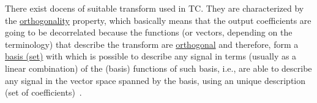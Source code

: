 \begin{comment}

  The Figure~\ref{fig:transform_coding} shows the stages that are
  tipycally involved in a transform-based signal compression system.

\begin{figure}
  \begin{center}
\begin{verbatim}
   s   +---+   w    +---+   k    +---+    c
 ----->| T |------->| Q |------->| E |-----------+
  (s)  +---+  (s)   +---+  (~s)  +---+   (~s)    |
samples   coefficients   indexes      code-words ~
                                                 :
                                                 ~
   ~s  +---+    w   +---+   k    +---+           |
 <-----| t |<-------| q |<-------| D |<----------+
  (~s) +---+  (~s)  +---+  (~s)  +---+
approx.    quantized     indexes
samples   coefficients
\end{verbatim}                
  \end{center}
  \caption{Common data-flow used un Transform Coding. $s$ represents
    the signal to compress, $\tilde{s}$ the lossy version of the
    reconstructed signal, $T$ the (forward) transform (which takes blocks of
    samples) producing blocks of coefficients $w$, $Q$ the scalar
    quantization stage (which takes single coefficients) producing
    quantization indexes $k$, $E$ the entropy encoder (which in our
    case (DEFLATE) works with blocks of coefficients) producing
    code-words $c$, $D$ the entropy decoder, $q$ the decuantization
    stage, and $t$ the inverse (or backward) transform. PCM stands for Puse Code
    Modulation and DEFLATE is the technique used to find a compact
    representation of the quantized coefficients.}
  \label{fig:transform_coding}
\end{figure}
\end{comment}

There exist docens of suitable transform used in TC. They are
characterized by the
\href{https://en.wikipedia.org/wiki/Orthogonality}{orthogonality}
property, which basically means that the output coefficients are going
to be decorrelated because the functions (or vectors, depending on the
terminology) that describe the transform are
\href{https://en.wikipedia.org/wiki/Orthogonal_functions}{orthogonal}
and therefore, form a
\href{https://en.wikipedia.org/wiki/Basis_(linear_algebra)}{basis
  (set)} with which is possible to describe any signal in terms
(usually as a linear combination) of the (basis) functions of such
basis, i.e., are able to describe any signal in the vector space
spanned by the basis, using an unique description (set of
coefficients)~\cite{}.

